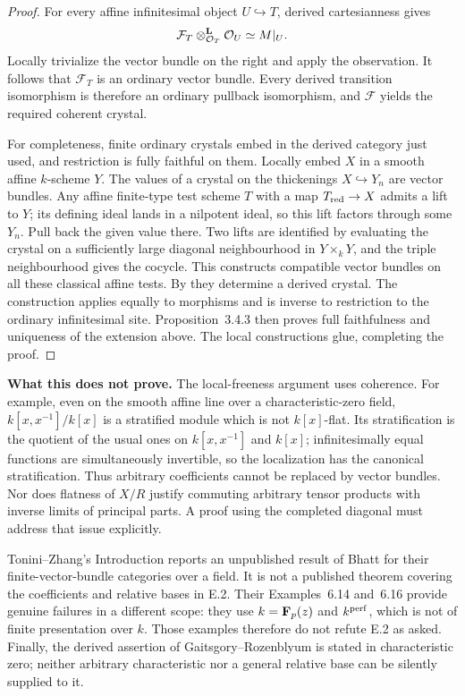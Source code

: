 \begin{proof}
For every affine infinitesimal object $U\hookrightarrow T$, derived cartesianness gives
\[
             \mathcal F_T\otimes_{\mathcal O_T}^{\mathbf L}\mathcal O_U
                            \simeq M|_U .
\]
Locally trivialize the vector bundle on the right and apply the observation.  It follows that $\mathcal F_T$ is an ordinary vector bundle.  Every derived transition isomorphism is therefore an ordinary pullback isomorphism, and $\mathcal F$ yields the required coherent crystal.

For completeness, finite ordinary crystals embed in the derived category just used, and restriction is fully faithful on them.  Locally embed $X$ in a smooth affine $k$-scheme $Y$.  The values of a crystal on the thickenings $X\hookrightarrow Y_n$ are vector bundles.  Any affine finite-type test scheme $T$ with a map $T_{\rm red}\to X$ admits a lift to $Y$; its defining ideal lands in a nilpotent ideal, so this lift factors through some $Y_n$.  Pull back the given value there.  Two lifts are identified by evaluating the crystal on a sufficiently large diagonal neighbourhood in $Y\times_kY$, and the triple neighbourhood gives the cocycle.  This constructs compatible vector bundles on all these classical affine tests.  By \cite[Corollary~2.2.2]{GaitsgoryRozenblyum2014} they determine a derived crystal.  The construction applies equally to morphisms and is inverse to restriction to the ordinary infinitesimal site.  Proposition~3.4.3 then proves full faithfulness and uniqueness of the extension above.  The local constructions glue, completing the proof.
\end{proof}

\par\smallskip\noindent\textbf{What this does not prove.}
The local-freeness argument uses coherence.  For example, even on the smooth affine line over a characteristic-zero field, $k[x,x^{-1}]/k[x]$ is a stratified module which is not $k[x]$-flat.  Its stratification is the quotient of the usual ones on $k[x,x^{-1}]$ and $k[x]$; infinitesimally equal functions are simultaneously invertible, so the localization has the canonical stratification.  Thus arbitrary coefficients cannot be replaced by vector bundles.  Nor does flatness of $X/R$ justify commuting arbitrary tensor products with inverse limits of principal parts.  A proof using the completed diagonal must address that issue explicitly.

Tonini--Zhang's Introduction reports an unpublished result of Bhatt for their finite-vector-bundle categories over a field.  It is not a published theorem covering the coefficients and relative bases in E.2.  Their Examples~6.14 and~6.16 provide genuine failures in a different scope: they use $k=\mathbf F_p(z)$ and $k^{\rm perf}$, which is not of finite presentation over $k$.  Those examples therefore do not refute E.2 as asked.  Finally, the derived assertion of Gaitsgory--Rozenblyum is stated in characteristic zero; neither arbitrary characteristic nor a general relative base can be silently supplied to it.



